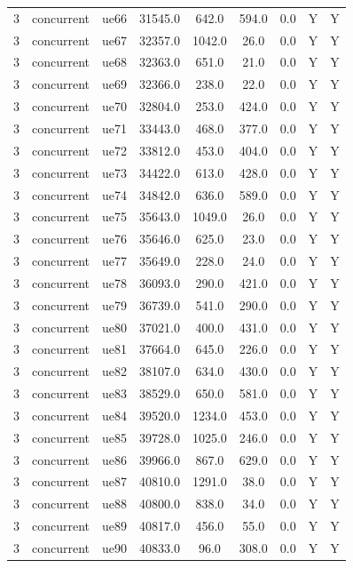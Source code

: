 \begin{table}[ht]
\begin{tabular}{|c|c|c|c|c|c|c|c|c|}
3 & concurrent & ue66 & 31545.0 & 642.0 & 594.0 & 0.0 & Y & Y \\
3 & concurrent & ue67 & 32357.0 & 1042.0 & 26.0 & 0.0 & Y & Y \\
3 & concurrent & ue68 & 32363.0 & 651.0 & 21.0 & 0.0 & Y & Y \\
3 & concurrent & ue69 & 32366.0 & 238.0 & 22.0 & 0.0 & Y & Y \\
3 & concurrent & ue70 & 32804.0 & 253.0 & 424.0 & 0.0 & Y & Y \\
3 & concurrent & ue71 & 33443.0 & 468.0 & 377.0 & 0.0 & Y & Y \\
3 & concurrent & ue72 & 33812.0 & 453.0 & 404.0 & 0.0 & Y & Y \\
3 & concurrent & ue73 & 34422.0 & 613.0 & 428.0 & 0.0 & Y & Y \\
3 & concurrent & ue74 & 34842.0 & 636.0 & 589.0 & 0.0 & Y & Y \\
3 & concurrent & ue75 & 35643.0 & 1049.0 & 26.0 & 0.0 & Y & Y \\
3 & concurrent & ue76 & 35646.0 & 625.0 & 23.0 & 0.0 & Y & Y \\
3 & concurrent & ue77 & 35649.0 & 228.0 & 24.0 & 0.0 & Y & Y \\
3 & concurrent & ue78 & 36093.0 & 290.0 & 421.0 & 0.0 & Y & Y \\
3 & concurrent & ue79 & 36739.0 & 541.0 & 290.0 & 0.0 & Y & Y \\
3 & concurrent & ue80 & 37021.0 & 400.0 & 431.0 & 0.0 & Y & Y \\
3 & concurrent & ue81 & 37664.0 & 645.0 & 226.0 & 0.0 & Y & Y \\
3 & concurrent & ue82 & 38107.0 & 634.0 & 430.0 & 0.0 & Y & Y \\
3 & concurrent & ue83 & 38529.0 & 650.0 & 581.0 & 0.0 & Y & Y \\
3 & concurrent & ue84 & 39520.0 & 1234.0 & 453.0 & 0.0 & Y & Y \\
3 & concurrent & ue85 & 39728.0 & 1025.0 & 246.0 & 0.0 & Y & Y \\
3 & concurrent & ue86 & 39966.0 & 867.0 & 629.0 & 0.0 & Y & Y \\
3 & concurrent & ue87 & 40810.0 & 1291.0 & 38.0 & 0.0 & Y & Y \\
3 & concurrent & ue88 & 40800.0 & 838.0 & 34.0 & 0.0 & Y & Y \\
3 & concurrent & ue89 & 40817.0 & 456.0 & 55.0 & 0.0 & Y & Y \\
3 & concurrent & ue90 & 40833.0 & 96.0 & 308.0 & 0.0 & Y & Y \\

\end{tabular}
\end{table}
